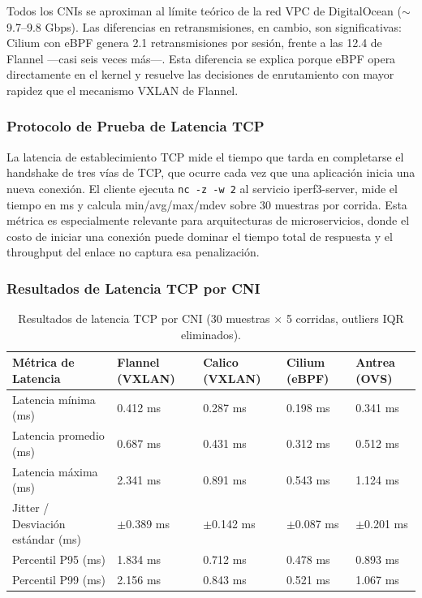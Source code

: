 Todos los CNIs se aproximan al límite teórico de la red VPC de DigitalOcean ($\sim$9.7--9.8 Gbps). Las diferencias en retransmisiones, en cambio, son significativas: Cilium con eBPF genera 2.1 retransmisiones por sesión, frente a las 12.4 de Flannel ---casi seis veces más---. Esta diferencia se explica porque eBPF opera directamente en el kernel y resuelve las decisiones de enrutamiento con mayor rapidez que el mecanismo VXLAN de Flannel.

\subsubsection{Protocolo de Prueba de Latencia TCP}

La latencia de establecimiento TCP mide el tiempo que tarda en completarse el handshake de tres vías de TCP, que ocurre cada vez que una aplicación inicia una nueva conexión. El cliente ejecuta \texttt{nc -z -w 2} al servicio iperf3-server, mide el tiempo en ms y calcula min/avg/max/mdev sobre 30 muestras por corrida. Esta métrica es especialmente relevante para arquitecturas de microservicios, donde el costo de iniciar una conexión puede dominar el tiempo total de respuesta y el throughput del enlace no captura esa penalización.

\subsubsection{Resultados de Latencia TCP por CNI}

\begin{table}[htbp]
\centering
\scriptsize
\begin{tabularx}{\textwidth}{|Y|Y|Y|Y|Y|}
\hline
\textbf{Métrica de Latencia} & \textbf{Flannel (VXLAN)} & \textbf{Calico (VXLAN)} & \textbf{Cilium (eBPF)} & \textbf{Antrea (OVS)} \\
\hline
Latencia mínima (ms) & 0.412 ms & 0.287 ms & 0.198 ms & 0.341 ms \\
Latencia promedio (ms) & 0.687 ms & 0.431 ms & 0.312 ms & 0.512 ms \\
Latencia máxima (ms) & 2.341 ms & 0.891 ms & 0.543 ms & 1.124 ms \\
Jitter / Desviación estándar (ms) & $\pm$0.389 ms & $\pm$0.142 ms & $\pm$0.087 ms & $\pm$0.201 ms \\
Percentil P95 (ms) & 1.834 ms & 0.712 ms & 0.478 ms & 0.893 ms \\
Percentil P99 (ms) & 2.156 ms & 0.843 ms & 0.521 ms & 1.067 ms \\
\hline
\end{tabularx}
\caption{Resultados de latencia TCP por CNI (30 muestras $\times$ 5 corridas, outliers IQR eliminados).}
\end{table}

